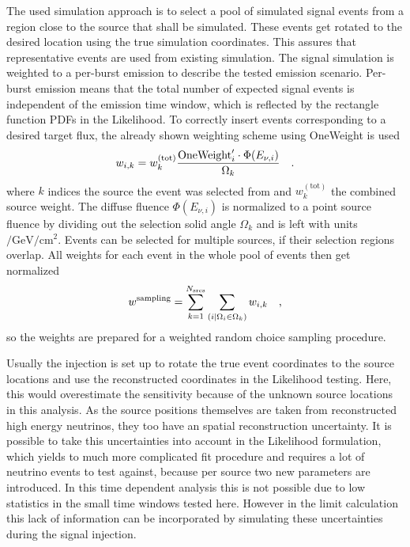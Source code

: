 The used simulation approach is to select a pool of simulated signal events from a region close to the source that shall be simulated.
These events get rotated to the desired location using the true simulation coordinates.
This assures that representative events are used from existing simulation.
The signal simulation is weighted to a per-burst emission to describe the tested emission scenario.
Per-burst emission means that the total number of expected signal events is independent of the emission time window, which is reflected by the rectangle function PDFs in the Likelihood.
To correctly insert events corresponding to a desired target flux, the already shown weighting scheme using OneWeight is used
\begin{equation}
  w_{i,k} = w_k^{(\text{tot})}\frac{\text{OneWeight}'_i \cdot \Phi(E_{\nu,i})}{\Omega_k}
  \quad\text{.}
\end{equation}
where $k$ indices the source the event was selected from and $w_k^{(\text{tot})}$ the combined source weight.
The diffuse fluence $\Phi(E_{\nu,i})$ is normalized to a point source fluence by dividing out the selection solid angle $\Omega_k$ and is left with units $\si{\per\GeV\per\cm\squared}$.
Events can be selected for multiple sources, if their selection regions overlap.
All weights for each event in the whole pool of events then get normalized
\begin{equation}
  w^\text{sampling}
  = \sum_{k=1}^{N_\text{srcs}} \sum_{(i|\Omega_i \in \Omega_k)} w_{i,k}
  \quad\text{,}
\end{equation}
so the weights are prepared for a weighted random choice sampling procedure.

Usually the injection is set up to rotate the true event coordinates to the source locations and use the reconstructed coordinates in the Likelihood testing.
Here, this would overestimate the sensitivity because of the unknown source locations in this analysis.
As the source positions themselves are taken from reconstructed high energy neutrinos, they too have an spatial reconstruction uncertainty.
It is possible to take this uncertainties into account in the Likelihood formulation, which yields to much more complicated fit procedure and requires a lot of neutrino events to test against, because per source two new parameters are introduced.
In this time dependent analysis this is not possible due to low statistics in the small time windows tested here.
However in the limit calculation this lack of information can be incorporated by simulating these uncertainties during the signal injection.

